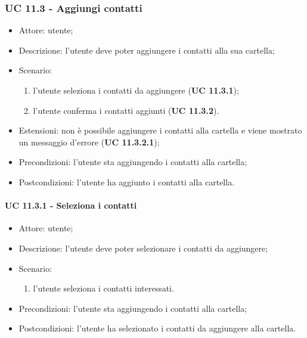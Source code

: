     \subsubsection{UC 11.3 - Aggiungi contatti}
    \begin{itemize}
        \item Attore: utente;
        \item Descrizione: l'utente deve poter aggiungere i contatti alla sua cartella;
        \item Scenario:
        \begin{enumerate}
        \item l'utente seleziona i contatti da aggiungere (\textbf{UC 11.3.1});
        \item l'utente conferma i contatti aggiunti (\textbf{UC 11.3.2}).
        \end{enumerate}
        \item Estensioni: non è possibile aggiungere i contatti alla cartella e viene mostrato un messaggio d'errore (\textbf{UC 11.3.2.1});
        \item Precondizioni: l'utente sta aggiungendo i contatti alla cartella;
        \item Postcondizioni: l'utente ha aggiunto i contatti alla cartella.
    \end{itemize}
    \paragraph{UC 11.3.1 - Seleziona i contatti}
        \begin{itemize}
            \item Attore: utente;
            \item Descrizione: l'utente deve poter selezionare i contatti da aggiungere;
            \item Scenario:
            \begin{enumerate}
                \item l'utente seleziona i contatti interessati.
            \end{enumerate}
        \item Precondizioni: l'utente sta aggiungendo i contatti alla cartella;
        \item Postcondizioni: l'utente ha selezionato i contatti da aggiungere alla cartella.
    \end{itemize}

